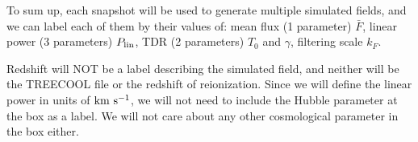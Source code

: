 
To sum up, each snapshot will be used to generate multiple simulated 
fields, and we can label each of them by their values of: 
mean flux (1 parameter) $\bar F$,
linear power (3 parameters) $P_{\rm lin}$,
TDR (2 parameters) $T_0$ and $\gamma$, 
filtering scale $k_F$.

Redshift will NOT be a label describing the simulated field, and neither
will be the TREECOOL file or the redshift of reionization.
Since we will define the linear power in units of ${\rm km~s^{-1}}$, we will not 
need to include the Hubble parameter at the box as a label.
We will not care about any other cosmological parameter in the box
either.
